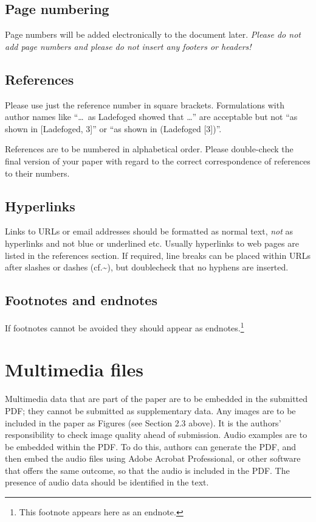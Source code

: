\documentclass[
  a4paper,
  11pt,
  twocolumn]{article}
\begin{document}
\subsection{Page numbering}

Page numbers will be added electronically to the document later.
\textit{Please do not add page numbers and please do not insert
any footers or headers!}

\subsection{References}

Please use just the reference number in square brackets. Formulations
with author names like ``\ldots~as Ladefoged \cite{Ladefoged:2003}
showed that \ldots'' are acceptable but not ``as shown in {[}Ladefoged,
3{]}'' or ``as shown in (Ladefoged {[}3{]})''.

References are to be numbered in alphabetical order. Please double-check
the final version of your paper with regard to the correct
correspondence of references to their numbers.

\subsection{Hyperlinks}

Links to URLs or email addresses should be formatted as normal text,
\textit{not} as hyperlinks and not blue or underlined etc. Usually
hyperlinks to web pages are listed in the references section. If
required, line breaks can be placed within URLs after slashes or dashes
(cf.\textasciitilde{}\cite{IPA-SIL,IPA-KEYBOARD}), but doublecheck that
no hyphens are inserted.

\subsection{Footnotes and endnotes}

If footnotes cannot be avoided they should appear as
endnotes.\footnote{This footnote appears here as an endnote.}

\section{Multimedia files}

Multimedia data that are part of the paper are to be embedded in the
submitted PDF; they cannot be submitted as supplementary data. Any
images are to be included in the paper as Figures (see Section 2.3
above). It is the authors' responsibility to check image quality ahead
of submission. Audio examples are to be embedded within the PDF. To do
this, authors can generate the PDF, and then embed the audio files using
Adobe Acrobat Professional, or other software that offers the same
outcome, so that the audio is included in the PDF. The presence of audio
data should be identified in the text.
\end{document}
